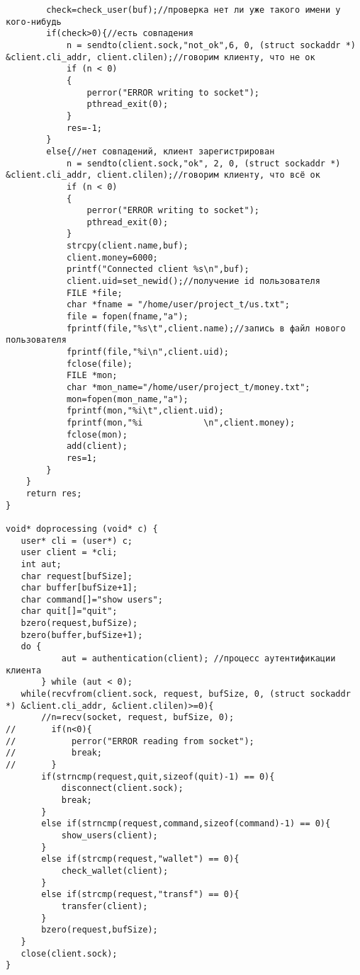 \documentclass[12pt,a4paper]{report}
\begin{document}
\begin{lstlisting}
        check=check_user(buf);//проверка нет ли уже такого имени у кого-нибудь
        if(check>0){//есть совпадения
            n = sendto(client.sock,"not_ok",6, 0, (struct sockaddr *) &client.cli_addr, client.clilen);//говорим клиенту, что не ок
            if (n < 0)
            {
                perror("ERROR writing to socket");
                pthread_exit(0);
            }
            res=-1;
        }
        else{//нет совпадений, клиент зарегистрирован
            n = sendto(client.sock,"ok", 2, 0, (struct sockaddr *) &client.cli_addr, client.clilen);//говорим клиенту, что всё ок
            if (n < 0)
            {
                perror("ERROR writing to socket");
                pthread_exit(0);
            }            
            strcpy(client.name,buf);
            client.money=6000;
            printf("Connected client %s\n",buf);
            client.uid=set_newid();//получение id пользователя
            FILE *file;
            char *fname = "/home/user/project_t/us.txt";
            file = fopen(fname,"a");
            fprintf(file,"%s\t",client.name);//запись в файл нового пользователя
            fprintf(file,"%i\n",client.uid);
            fclose(file);
            FILE *mon;
            char *mon_name="/home/user/project_t/money.txt";
            mon=fopen(mon_name,"a");
            fprintf(mon,"%i\t",client.uid);
            fprintf(mon,"%i            \n",client.money);
            fclose(mon);
            add(client);
            res=1;
        }
    }
    return res;
}

void* doprocessing (void* c) {
   user* cli = (user*) c;
   user client = *cli;
   int aut;
   char request[bufSize];
   char buffer[bufSize+1];
   char command[]="show users";
   char quit[]="quit";
   bzero(request,bufSize);
   bzero(buffer,bufSize+1);
   do {
           aut = authentication(client); //процесс аутентификации клиента
       } while (aut < 0);
   while(recvfrom(client.sock, request, bufSize, 0, (struct sockaddr *) &client.cli_addr, &client.clilen)>=0){
       //n=recv(socket, request, bufSize, 0);
//       if(n<0){
//           perror("ERROR reading from socket");
//           break;
//       }
       if(strncmp(request,quit,sizeof(quit)-1) == 0){
           disconnect(client.sock);
           break;
       }
       else if(strncmp(request,command,sizeof(command)-1) == 0){
           show_users(client);
       }
       else if(strcmp(request,"wallet") == 0){
           check_wallet(client);
       }
       else if(strcmp(request,"transf") == 0){
           transfer(client);
       }
       bzero(request,bufSize);
   }
   close(client.sock);
}


\end{lstlisting}
\end{document}

